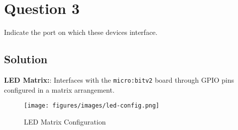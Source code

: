 \section*{Question 3}

Indicate the port on which these devices interface.

\subsection*{Solution}

\textbf{LED Matrix:}: Interfaces with the \texttt{micro:bit\;v2} board through GPIO pins configured in a matrix arrangement.

\begin{figure*}[htbp]
    \centering
    \texttt{[image: figures/images/led-config.png]}
    \caption{
        LED Matrix Configuration
    }\label{fig:led-config}
\end{figure*}
